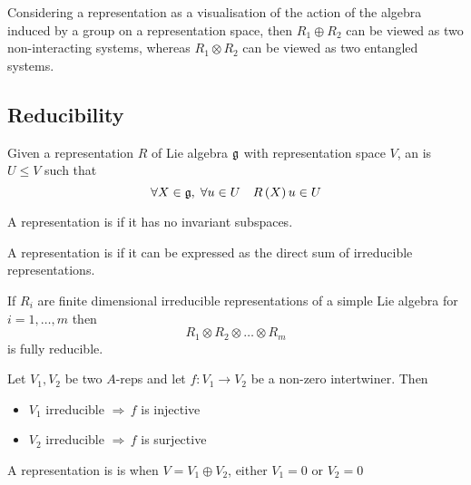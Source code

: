 \documentclass{article}
\begin{document}
\begin{idea}
	Considering a representation as a visualisation of the action of the algebra induced by a  group on a representation space, then $R_1 \oplus R_2$ can be viewed as two non-interacting systems, whereas $R_1 \otimes R_2$ can be viewed as two entangled systems.
\end{idea}

\subsection{Reducibility}
\begin{definition}
	Given a representation $R$ of Lie algebra $\mathfrak{g}$ with representation space $V$, an  is $U\leq V$ such that
	\[
	\forall X\in\mathfrak{g}, \; \forall u\in U \quad R\left(X\right)u\in U
	\]
\end{definition}

\begin{definition}
	A representation is  if it has no invariant subspaces. 
\end{definition}

\begin{definition}
	A representation is  if it can be expressed as the direct sum of irreducible representations. 
\end{definition}

\begin{fact}
	If $R_i$ are finite dimensional irreducible representations of a simple Lie algebra for $i=1,\dots,m$ then
	\[
	R_1 \otimes R_2 \otimes \dots \otimes R_m
	\]
	is fully reducible. 
\end{fact}

\begin{lemma}[Schur]
	Let $V_1,V_2$ be two $A$-reps and let $f:V_1 \to V_2$ be a non-zero intertwiner. Then
	\begin{itemize}
		\item $V_1$ irreducible $\Rightarrow \, f$ is injective
		\item $V_2$ irreducible $\Rightarrow \, f$ is surjective 
	\end{itemize}
\end{lemma}

\begin{definition}
	A representation is  is when $V = V_1 \oplus V_2$, either $V_1 = 0$ or $V_2 = 0$
\end{definition}
\end{document}
